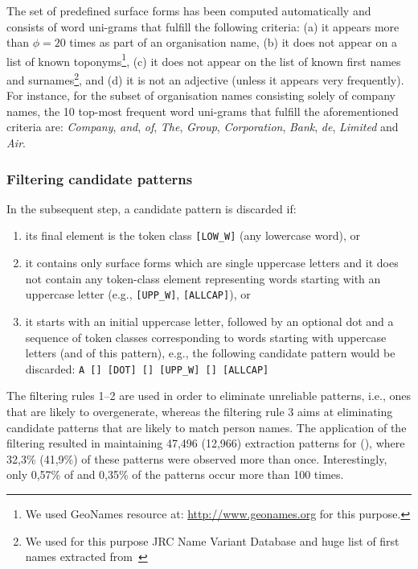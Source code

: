 \documentclass[output=paper]{langsci/langscibook}
\begin{document}
The set of predefined surface forms has been computed automatically and consists of word uni-grams that fulfill the following criteria: (a) it appears more than $\phi=20$ times as part of an organisation name, (b) it does not appear on a list of known toponyms\footnote{We used GeoNames resource at: \url{http://www.geonames.org} for this purpose.}, (c) it does not appear on the list of known first names and surnames\footnote{We used for this purpose {\sc JRC Name Variant Database} and huge list of first names extracted from~\cite{piskorski-11}}, and (d) it is not an adjective (unless it appears very frequently). For instance, for the subset of  organisation names consisting solely of company names, the 10 top-most frequent word uni-grams that fulfill the aforementioned criteria are: \textit{Company}, \textit{and}, \textit{of}, \textit{The}, \textit{Group}, \textit{Corporation}, \textit{Bank}, \textit{de}, \textit{Limited} and \textit{Air}.  

\subsubsection{Filtering candidate patterns} In the subsequent
step, a candidate pattern is discarded if:
\begin{enumerate}
\item its final element is the token class \verb+[LOW_W]+ (any
  lowercase word), or
\item it contains only surface forms which are single uppercase
  letters and it does not contain any token-class element representing
  words starting with an uppercase letter (e.g., \verb+[UPP_W]+,
  \verb+[ALLCAP]+), or
\item it starts with an initial uppercase letter, followed by an
  optional dot and a sequence of token classes corresponding to words
  starting with uppercase letters (and  of this pattern),
  e.g., the following candidate pattern would be discarded:
  \verb+A [] [DOT] [] [UPP_W] [] [ALLCAP]+
\end{enumerate} 

The filtering rules 1--2 are used in order to eliminate
unreliable patterns, i.e., ones that are likely to overgenerate,
whereas the filtering rule 3 aims at eliminating candidate patterns
that are likely to match person names.  The application of the
filtering resulted in maintaining 47,496 (12,966) extraction patterns
for  (), where 32,3\% (41,9\%) of these patterns were
observed more than once. Interestingly, only 0,57\% of  and
0,35\% of the  patterns occur more than 
100 times.
\end{document}
